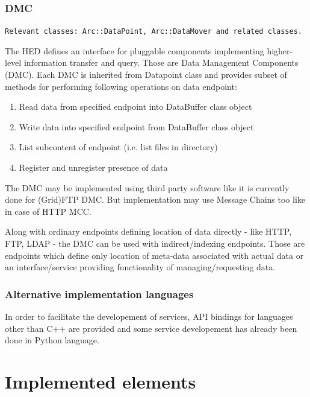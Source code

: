 \documentclass{book}
\begin{document}
\subsection{DMC}

\texttt{Relevant classes: Arc::DataPoint, Arc::DataMover and related classes.}

The HED defines an interface for pluggable components implementing higher-level information transfer and query. Those are Data Management Components (DMC). Each DMC is inherited from Datapoint class and provides subset of methods for performing following operations on data endpoint:

\begin{enumerate}

\item Read data from specified endpoint into DataBuffer class object

\item Write data into specified endpoint from DataBuffer class object

\item List subcontent of endpoint (i.e. list files in directory)

\item Register and unregister presence of data

\end{enumerate}

The DMC may be implemented using third party software like it is currently done for (Grid)FTP DMC. But implementation may use Message Chains too like in case of HTTP MCC.

Along with ordinary endpoints defining location of data directly - like HTTP, FTP, LDAP - the DMC can be used with indirect/indexing endpoints. Those are endpoints which define only location of meta-data associated with actual data or an interface/service providing functionality of managing/requesting data.


\subsection{Alternative implementation languages}

In order to facilitate the developement of services, API bindings for languages other than C++ are provided and some service developement has already been done in Python language.



\chapter{Implemented elements}
\end{document}

